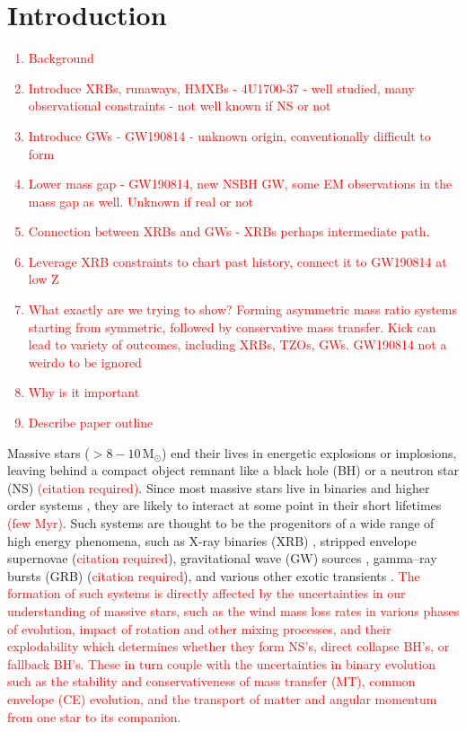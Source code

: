 \documentclass[linenumbers,trackchanges,twocolumn]{aastex701}
\newcommand{\Mdot}{\mathrm{M}_{\odot}}
\newcommand{\red}{\textcolor{red}}
\begin{document}
\section{Introduction}
\red{
\begin{enumerate}
    \item Background
    \item Introduce XRBs, runaways, HMXBs - 4U1700-37 - well studied, many observational constraints - not well known if NS or not
    \item Introduce GWs  - GW190814 - unknown origin, conventionally difficult to form
    \item Lower mass gap - GW190814, new NSBH GW, some EM observations in the mass gap as well. Unknown if real or not
    \item Connection between XRBs and GWs - XRBs perhaps intermediate path.
    \item Leverage XRB constraints to chart past history, connect it to GW190814 at low Z
    \item What exactly are we trying to show? Forming asymmetric mass ratio systems starting from symmetric, followed by conservative mass transfer. Kick can lead to variety of outcomes, including XRBs, TZOs, GWs. GW190814 not a weirdo to be ignored
    \item Why is it important
    \item Describe paper outline
\end{enumerate}
}

Massive stars ($> 8-10\,\Mdot$) end their lives in energetic explosions or implosions, leaving behind a compact object remnant like a black hole (BH) or a neutron star (NS) \red{(citation required)}. Since most massive stars live in binaries and higher order systems \citep{2012Sci...337..444S,2017ApJS..230...15M, 2023ASPC..534..275O}, they are likely to interact at some point in their short lifetimes \red{(few $\mathrm{Myr}$)}. Such systems are thought to be the progenitors of a wide range of high energy phenomena, such as X-ray binaries (XRB) \citep{2006csxs.book..623T}, stripped envelope supernovae (\red{citation required}), gravitational wave (GW) sources \citep{2017ApJ...846..170T, 2022PhR...955....1M, 2023PhRvX..13d1039A}, gamma--ray bursts (GRB) (\red{citation required}), and various other exotic transients \citep{2012ApJ...752L...2C,2022ApJ...932...84M}. \red{The formation of such systems is directly affected by the uncertainties in our understanding of massive stars, such as the wind mass loss rates in various phases of evolution, impact of rotation and other mixing processes, and their explodability which determines whether they form NS's, direct collapse BH's, or fallback BH's. These in turn couple with the uncertainties in binary evolution such as the stability and conservativeness of mass transfer (MT), common envelope (CE) evolution, and the transport of matter and angular momentum from one star to its companion.}
\end{document}
